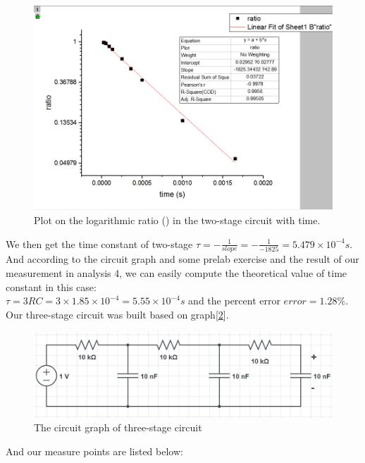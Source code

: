 \begin{figure}[!htbp]
	\centering %
	\includegraphics[width=\linewidth]{images/2_6.PNG} %
	\caption{Plot on the logarithmic ratio ({\tiny }) in the two-stage circuit with time.} %
	\label{fig:2.6} %
\end{figure}
\phantom{ } We then get the time constant of two-stage 
$\tau = -\frac{1}{slope} = -\frac{1}{-1825} = 5.479\times10^{-4}s $.\\ And according to the circuit graph and some prelab exercise and the result of our measurement in analysis 4, we can easily compute
the theoretical value of time constant in this case:\\
$\tau = 3RC = 3\times1.85\times10^{-4} = 5.55\times10^{-4}s$ and the percent error $error = 1.28\%$.\\
\phantom{ } Our three-stage circuit was built based on graph[\ref{fig:2.4}].\\
\begin{figure}[!htbp]
	\centering %
	\includegraphics[width=\linewidth]{images/2_4.PNG} %
	\caption{The circuit graph of three-stage circuit} %
	\label{fig:2.4} %
\end{figure}
\phantom{ }And our measure points are listed below:\\
